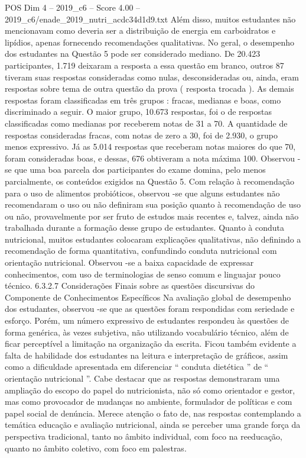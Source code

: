 \begin{textsample}{POS Dim 4 – 2019\_c6 – Score 4.00 – 2019\_c6/enade\_2019\_nutri\_acdc34d1d9.txt}
Além disso, muitos estudantes não mencionavam como deveria ser a distribuição de energia em carboidratos e lipídios, apenas fornecendo recomendações qualitativas.
No geral, o desempenho dos estudantes na Questão 5 pode ser considerado mediano.
De 20.423 participantes, 1.719 deixaram a resposta a essa questão em branco, outros 87 tiveram suas respostas consideradas como nulas, desconsideradas ou, ainda, eram respostas sobre tema de outra questão da prova ( resposta trocada ).
As demais respostas foram classificadas em três grupos : fracas, medianas e boas, como discriminado a seguir.
O maior grupo, 10.673 respostas, foi o de respostas classificadas como medianas por receberem notas de 31 a 70.
A quantidade de respostas consideradas fracas, com notas de zero a 30, foi de 2.930, o grupo menos expressivo.
Já as 5.014 respostas que receberam notas maiores do que 70, foram consideradas boas, e dessas, 676 obtiveram a nota máxima 100.
Observou -se que uma boa parcela dos participantes do exame domina, pelo menos parcialmente, os conteúdos exigidos na Questão 5.
Com relação à recomendação para o uso de alimentos probióticos, observou -se que alguns estudantes não recomendaram o uso ou não definiram sua posição quanto à recomendação de uso ou não, provavelmente por ser fruto de estudos mais recentes e, talvez, ainda não trabalhada durante a formação desse grupo de estudantes.
Quanto à conduta nutricional, muitos estudantes colocaram explicações qualitativas, não definindo a recomendação de forma quantitativa, confundindo conduta nutricional com orientação nutricional.
Observou -se a baixa capacidade de expressar conhecimentos, com uso de terminologias de senso comum e linguajar pouco técnico. 6.3.2.7 Considerações Finais sobre as questões discursivas do Componente de Conhecimentos Específicos Na avaliação global de desempenho dos estudantes, observou -se que as questões foram respondidas com seriedade e esforço.
Porém, um número expressivo de estudantes respondeu às questões de forma genérica, às vezes subjetiva, não utilizando vocabulário técnico, além de ficar perceptível a limitação na organização da escrita.
Ficou também evidente a falta de habilidade dos estudantes na leitura e interpretação de gráficos, assim como a dificuldade apresentada em diferenciar “ conduta dietética ” de “ orientação nutricional ”.
Cabe destacar que as respostas demonstraram uma ampliação do escopo do papel do nutricionista, não só como orientador e gestor, mas como provocador de mudanças no ambiente, formulador de políticas e com papel social de denúncia.
Merece atenção o fato de, nas respostas contemplando a temática educação e avaliação nutricional, ainda se perceber uma grande força da perspectiva tradicional, tanto no âmbito individual, com foco na reeducação, quanto no âmbito coletivo, com foco em palestras.

\end{textsample}
